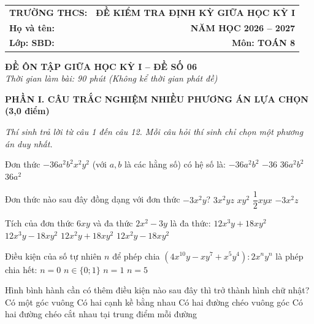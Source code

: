 \documentclass[12pt,a4paper]{article}
\begin{document}
\noindent
\begin{tabularx}{\linewidth}{X r}
\textbf{TRƯỜNG THCS: \dotfill} & \textbf{ĐỀ KIỂM TRA ĐỊNH KỲ GIỮA HỌC KỲ I} \\
\textbf{Họ và tên: \dotfill} & \textbf{NĂM HỌC 2026 -- 2027} \\
\textbf{Lớp: \dotfill \quad SBD: \dotfill} & \textbf{Môn: TOÁN 8} \\
\hline
\end{tabularx}
\vspace{2mm}

\begin{center}
  \textbf{\large ĐỀ ÔN TẬP GIỮA HỌC KỲ I -- ĐỀ SỐ 06}\\
  \textit{Thời gian làm bài: 90 phút (Không kể thời gian phát đề)}
\end{center}
\vspace{1mm}

\noindent\textbf{\large PHẦN I. CÂU TRẮC NGHIỆM NHIỀU PHƯƠNG ÁN LỰA CHỌN (3,0 điểm)}

\textit{Thí sinh trả lời từ câu 1 đến câu 12. Mỗi câu hỏi thí sinh chỉ chọn một phương án duy nhất.}

\vspace{1mm}
\begin{ex}
Đơn thức $-36a^2b^2x^2y^2$ (với $a, b$ là các hằng số) có hệ số là:
\choice
{\True $-36a^2b^2$}
{$-36$}
{$36a^2b^2$}
{$36a^2$}
\end{ex}

\begin{ex}
Đơn thức nào sau đây đồng dạng với đơn thức $-3x^2y$?
\choice
{$3x^2yz$}
{$xy^2$}
{\True $\dfrac{1}{2}xyx$}
{$-3x^2z$}
\end{ex}

\begin{ex}
Tích của đơn thức $6xy$ và đa thức $2x^2 - 3y$ là đa thức:
\choice
{$12x^3y + 18xy^2$}
{\True $12x^3y - 18xy^2$}
{$12x^2y + 18xy^2$}
{$12x^2y - 18xy^2$}
\end{ex}

\begin{ex}
Điều kiện của số tự nhiên $n$ để phép chia $(4x^{10}y - xy^7 + x^5y^4) : 2x^n y^n$ là phép chia hết:
\choice
{$n = 0$}
{\True $n \in \{0; 1\}$}
{$n = 1$}
{$n = 5$}
\end{ex}

\begin{ex}
Hình bình hành cần có thêm điều kiện nào sau đây thì trở thành hình chữ nhật?
\choice
{\True Có một góc vuông}
{Có hai cạnh kề bằng nhau}
{Có hai đường chéo vuông góc}
{Có hai đường chéo cắt nhau tại trung điểm mỗi đường}
\end{ex}
\end{document}
